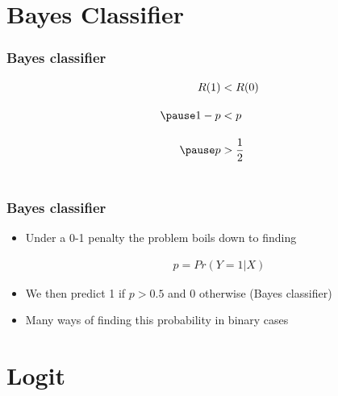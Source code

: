 \documentclass[
  shownotes,
  xcolor={svgnames},
  hyperref={colorlinks,citecolor=DarkBlue,linkcolor=andesred,urlcolor=DarkBlue}
  , aspectratio=169]{beamer}
\begin{document}
\section{Bayes Classifier}

\begin{frame}[fragile]
\frametitle{Bayes classifier}

\begin{eqnarray}
R(1) &< R(0)  \\[10pt] \nonumber \pause
1-p &< p \\[10pt] \nonumber \pause
p &> \frac{1}{2} \\ \nonumber
\end{eqnarray}


\end{frame}
\begin{frame}[fragile]
\frametitle{Bayes classifier}

\begin{itemize}
  \item Under a 0-1 penalty the problem boils down to finding 

\begin{align}
p=Pr(Y=1|X)
\end{align}
  
  \medskip
  \item We then predict 1 if $p>0.5$ and 0 otherwise (Bayes classifier)
  \medskip
  \item Many ways of finding this probability in binary cases
\end{itemize}


\end{frame}
\section{Logit}
\end{document}
